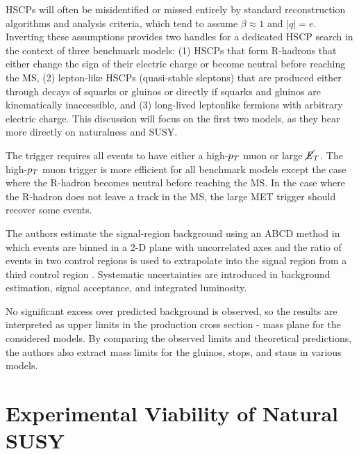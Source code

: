 \documentclass[12pt]{article}
\begin{document}
    HSCPs will often be misidentified or missed entirely by standard reconstruction algorithms and analysis criteria, which tend to assume $\beta \approx \num{1}$ and $\lvert q \rvert = e$. Inverting these assumptions provides two handles for a dedicated HSCP search in the context of three benchmark models: (1) HSCPs that form R-hadrons that either change the sign of their electric charge or become neutral before reaching the MS, (2) lepton-like HSCPs (quasi-stable sleptons) that are produced either through decays of squarks or gluinos or directly if squarks and gluinos are kinematically inaccessible, and (3) long-lived leptonlike fermions with arbitrary electric charge. This discussion will focus on the first two models, as they bear more directly on naturalness and SUSY.

     

    The trigger requires all events to have either a high-$p_T$ muon or large $\cancel{\it{E}}_{T}$. The high-$p_T$ muon trigger is more efficient for all benchmark models except the case where the R-hadron becomes neutral before reaching the MS. In the case where the R-hadron does not leave a track in the MS, the large MET trigger should recover some events.  

    The authors estimate the signal-region background using an ABCD method in which events are binned in a 2-D plane with uncorrelated axes and the ratio of events in two control regions is used to extrapolate into the signal region from a third control region . Systematic uncertainties are introduced in background estimation, signal acceptance, and integrated luminosity.

    No significant excess over predicted background is observed, so the results are interpreted as upper limits in the production cross section - mass plane for the considered models. By comparing the observed limits and theoretical predictions, the authors also extract mass limits for the gluinos, stops, and staus in various models. 

\section{Experimental Viability of Natural SUSY}
      
\end{document}
